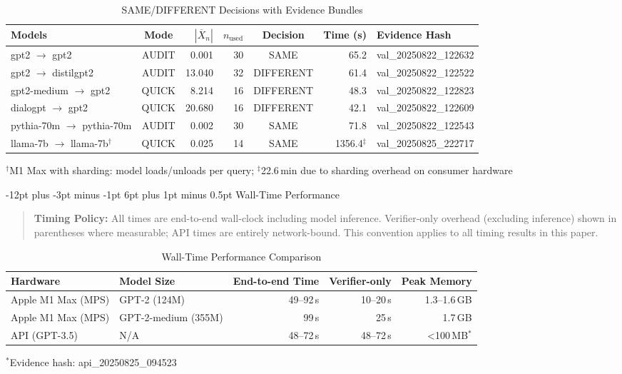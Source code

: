 \documentclass[11pt]{article}
\makeatletter
\renewcommand\subsection{\@startsection{subsection}{2}{\z@}%
  {-12pt plus -3pt minus -1pt}%
  {6pt plus 1pt minus 0.5pt}%
  {\normalfont\large\bfseries}}
\makeatother
\begin{document}
\begin{table}[ht!]
\centering
\caption{SAME/DIFFERENT Decisions with Evidence Bundles}
\label{tab:decisions}
\small
\begin{tabular}{@{}l c r r c r l@{}}
\toprule
\textbf{Models} & \textbf{Mode} & \textbf{$|\overline{X}_n|$} & \textbf{$n_{\text{used}}$} & \textbf{Decision} & \textbf{Time (s)} & \textbf{Evidence Hash} \\
\midrule
gpt2 $\to$ gpt2 & AUDIT & 0.001 & 30 & SAME & 65.2 & val\_20250822\_122632 \\
gpt2 $\to$ distilgpt2 & AUDIT & 13.040 & 32 & DIFFERENT & 61.4 & val\_20250822\_122522 \\
gpt2-medium $\to$ gpt2 & QUICK & 8.214 & 16 & DIFFERENT & 48.3 & val\_20250822\_122823 \\
dialogpt $\to$ gpt2 & QUICK & 20.680 & 16 & DIFFERENT & 42.1 & val\_20250822\_122609 \\
pythia-70m $\to$ pythia-70m & AUDIT & 0.002 & 30 & SAME & 71.8 & val\_20250822\_122543 \\
llama-7b $\to$ llama-7b$^{\dagger}$ & QUICK & 0.025 & 14 & SAME & 1356.4$^{\ddagger}$ & val\_20250825\_222717 \\
\bottomrule
\end{tabular}

\vspace{3pt}
\footnotesize{$^{\dagger}$M1 Max with sharding: model loads/unloads per query; $^{\ddagger}$22.6\,min due to sharding overhead on consumer hardware}
\end{table}

\subsection{Wall-Time Performance}

\begin{quote}
\footnotesize
\textbf{Timing Policy:} All times are end-to-end wall-clock including model inference. Verifier-only overhead (excluding inference) shown in parentheses where measurable; API times are entirely network-bound. This convention applies to all timing results in this paper.
\end{quote}

\begin{table}[ht!]
\centering
\caption{Wall-Time Performance Comparison}
\label{tab:wall-time}
\small
\begin{tabular}{l l r r r}
\toprule
\textbf{Hardware} & \textbf{Model Size} & \textbf{End-to-end Time} & \textbf{Verifier-only} & \textbf{Peak Memory} \\
\midrule
Apple M1 Max (MPS) & GPT-2 (124M) & 49--92\,s & 10--20\,s & 1.3--1.6\,GB \\
Apple M1 Max (MPS) & GPT-2-medium (355M) & 99\,s & 25\,s & 1.7\,GB \\
API (GPT-3.5) & N/A & 48--72\,s & 48--72\,s & <100\,MB$^*$ \\
\bottomrule
\end{tabular}

\vspace{3pt}
\footnotesize{$^*$Evidence hash: api\_20250825\_094523}
\end{table}
\end{document}

